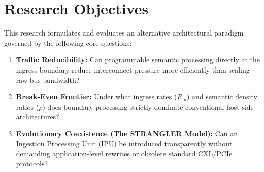 \section{Research Objectives}
This research formulates and evaluates an alternative architectural paradigm governed by the following core questions:
\begin{enumerate}
    \item \textbf{Traffic Reducibility:} Can programmable semantic processing directly at the ingress boundary reduce interconnect pressure more efficiently than scaling raw bus bandwidth?
    \item \textbf{Break-Even Frontier:} Under what ingress rates ($R_{\text{in}}$) and semantic density ratios ($\rho$) does boundary processing strictly dominate conventional host-side architectures?
    \item \textbf{Evolutionary Coexistence (The STRANGLER Model):} Can an Ingestion Processing Unit (IPU) be introduced transparently without demanding application-level rewrites or obsolete standard CXL/PCIe protocols?
\end{enumerate}
